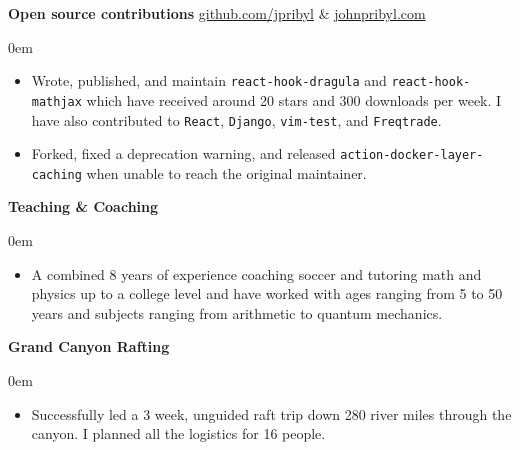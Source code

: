 \documentclass[11pt]{resume}
\begin{document}
\begin{minipage}[t]{1\textwidth}
      {\bf Open source contributions\textemdash \hspace{.5em}} \textcolor{lavender}{\faGithub\hspace{.5em}\underline{\href{http://www.github.com/jpribyl}{github.com/jpribyl}}} \hspace{.5em} \& \hspace{.5em} \textcolor{lavender}{\faGlobe\hspace{.5em}\underline{\href{http://www.johnpribyl.com}{johnpribyl.com}}}
      \vspace{.5em}
      \begin{addmargin}[.5em]{0em}
        \begin{itemize}
            \setlength\itemsep{.1em}
          \item {Wrote, published, and maintain \verb|react-hook-dragula| and
              \verb|react-hook-mathjax| which have received around 20 stars and
              300 downloads per week. I have also contributed to \verb|React|,
              \verb|Django|, \verb|vim-test|, and \verb|Freqtrade|.}

          \item {Forked, fixed a deprecation warning, and released
            \verb|action-docker-layer-caching| when unable to reach the
            original maintainer.}

        \end{itemize}
      \end{addmargin}

      \vspace{.5em}
      {\bf Teaching \& Coaching}
      \vspace{.5em}
      \begin{addmargin}[.5em]{0em}
        \begin{itemize}
            \setlength\itemsep{.1em}
          \item {A combined 8 years of experience coaching soccer and
                tutoring math and physics up to a college level and have worked with ages
              ranging from 5 to 50 years and subjects ranging from arithmetic to quantum mechanics.}
        \end{itemize}
      \end{addmargin}

      \vspace{.5em}
      {\bf Grand Canyon Rafting}
      \vspace{.5em}
      \begin{addmargin}[.5em]{0em}
        \begin{itemize}
            \setlength\itemsep{.1em}

        \item {Successfully led a 3 week, unguided raft trip down 280 river
          miles through the canyon. I planned all the logistics for 16 people.}


        \end{itemize}
      \end{addmargin}
    \end{minipage}
\end{document}
